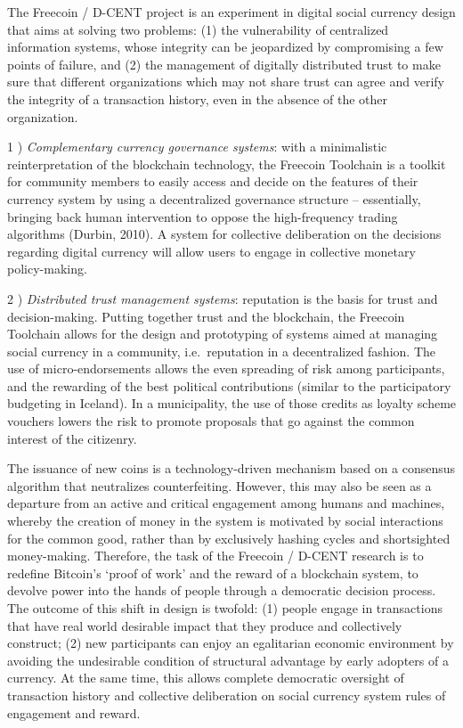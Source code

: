 The Freecoin / D-CENT project is an experiment in digital social
currency design that aims at solving two problems: (1) the vulnerability
of centralized information systems, whose integrity can be jeopardized
by compromising a few points of failure, and (2) the management of
digitally distributed trust to make sure that different organizations
which may not share trust can agree and verify the integrity of a
transaction history, even in the absence of the other organization.

1 ) \emph{Complementary currency governance systems}: with a
minimalistic reinterpretation of the blockchain technology, the Freecoin
Toolchain is a toolkit for community members to easily access and decide
on the features of their currency system by using a decentralized
governance structure -- essentially, bringing back human intervention to
oppose the high-frequency trading algorithms (Durbin, 2010). A system
for collective deliberation on the decisions regarding digital currency
will allow users to engage in collective monetary policy-making.

2 ) \emph{Distributed trust management systems}: reputation is the basis
for trust and decision-making. Putting together trust and the
blockchain, the Freecoin Toolchain allows for the design and prototyping
of systems aimed at managing social currency in a community,
i.e.~reputation in a decentralized fashion. The use of
micro-endorsements allows the even spreading of risk among participants,
and the rewarding of the best political contributions (similar to the
participatory budgeting in Iceland). In a municipality, the use of those
credits as loyalty scheme vouchers lowers the risk to promote proposals
that go against the common interest of the citizenry.

The issuance of new coins is a technology-driven mechanism based on a
consensus algorithm that neutralizes counterfeiting. However, this may
also be seen as a departure from an active and critical engagement among
humans and machines, whereby the creation of money in the system is
motivated by social interactions for the common good, rather than by
exclusively hashing cycles and shortsighted money-making. Therefore, the
task of the Freecoin / D-CENT research is to redefine Bitcoin's `proof
of work' and the reward of a blockchain system, to devolve power into
the hands of people through a democratic decision process. The outcome
of this shift in design is twofold: (1) people engage in transactions
that have real world desirable impact that they produce and collectively
construct; (2) new participants can enjoy an egalitarian economic
environment by avoiding the undesirable condition of structural
advantage by early adopters of a currency. At the same time, this allows
complete democratic oversight of transaction history and collective
deliberation on social currency system rules of engagement and reward.

